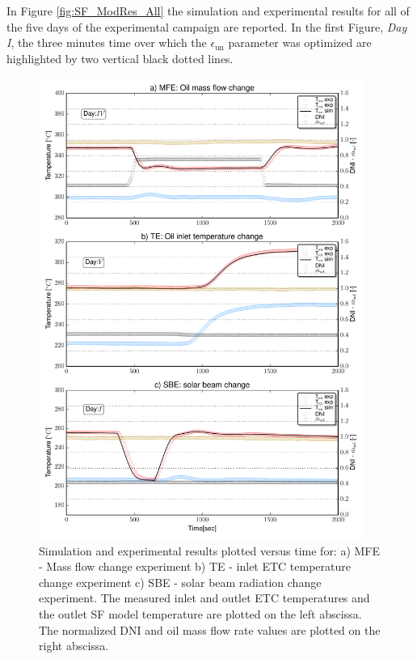 \documentclass[final,3p,times,review]{elsarticle}
\begin{document}
In Figure \ref{fig:SF_ModRes_All} the simulation and experimental results for all of the five days of the experimental campaign are reported. In the first Figure, \textit{Day I}, the three minutes time over which the $\epsilon_\mathrm{un}$ parameter was optimized are highlighted by two vertical black dotted lines.
\clearpage
%
\begin{figure}[h!]
\centering
\includegraphics[width=0.95\textwidth]{Figures/_MassFlowChange.pdf}
\caption{Simulation and experimental results plotted versus time for: a) MFE - Mass flow change experiment  b) TE - inlet ETC temperature change experiment c) SBE - solar beam radiation change experiment. The measured inlet and outlet ETC temperatures and the outlet SF model temperature are plotted on the left abscissa. The normalized DNI and oil mass flow rate values are plotted on the right abscissa.}
\label{fig:SF_ModRes_Zoomed}
\end{figure}
%
%
\end{document}
